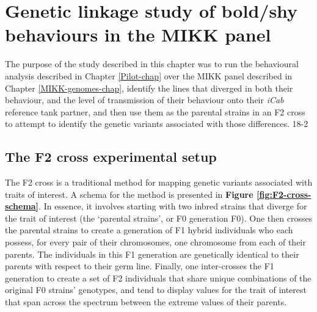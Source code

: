 \documentclass[
]{article}
\author{}
\date{\vspace{-2.5em}}
\begin{document}
{
\setcounter{tocdepth}{2}
\tableofcontents
}
\hypertarget{MIKK-F2-chap}{%
\section{Genetic linkage study of bold/shy behaviours in the MIKK panel}\label{MIKK-F2-chap}}

The purpose of the study described in this chapter was to run the behavioural analysis described in Chapter \ref{Pilot-chap} over the MIKK panel described in Chapter \ref{MIKK-genomes-chap}, identify the lines that diverged in both their behaviour, and the level of transmission of their behaviour onto their \emph{\textcolor{iCab_424B4D}{iCab}} reference tank partner, and then use them as the parental strains in an F2 cross to attempt to identify the genetic variants associated with those differences. \textcolor{18-2_FF66A6}{18-2}

\hypertarget{MIKK-F2-cross}{%
\subsection{The F2 cross experimental setup}\label{MIKK-F2-cross}}

The F2 cross is a traditional method for mapping genetic variants associated with traits of interest. A schema for the method is presented in \textbf{Figure \ref{fig:F2-cross-schema}}. In essence, it involves starting with two inbred strains that diverge for the trait of interest (the `parental strains', or F0 generation F0). One then crosses the parental strains to create a generation of F1 hybrid individuals who each possess, for every pair of their chromosomes, one chromosome from each of their parents. The individuals in this F1 generation are genetically identical to their parents with respect to their germ line. Finally, one inter-crosses the F1 generation to create a set of F2 individuals that share unique combinations of the original F0 strains' genotypes, and tend to display values for the trait of interest that span across the spectrum between the extreme values of their parents.
\end{document}
